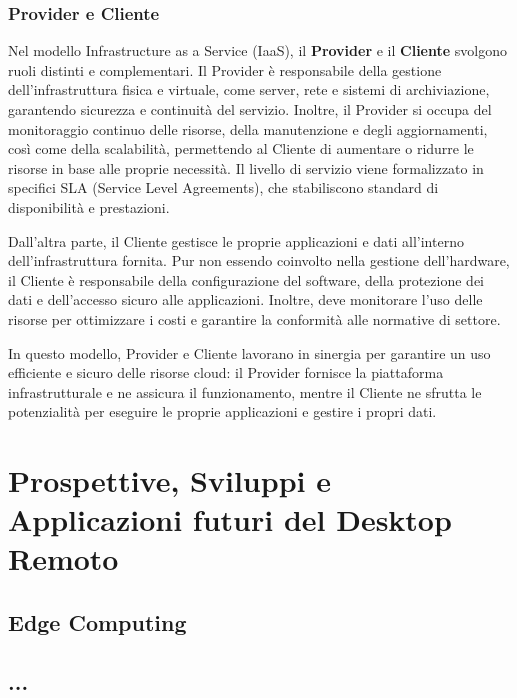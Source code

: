 \documentclass[12pt,a4paper,openright,twoside]{book}
\begin{document}
\subsection{Provider e Cliente}
\label{subsec:provider_cliente}

Nel modello Infrastructure as a Service (IaaS), il \textbf{Provider} e il \textbf{Cliente} svolgono ruoli distinti e complementari. Il Provider è responsabile della gestione dell'infrastruttura fisica e virtuale, come server, rete e sistemi di archiviazione, garantendo sicurezza e continuità del servizio. Inoltre, il Provider si occupa del monitoraggio continuo delle risorse, della manutenzione e degli aggiornamenti, così come della scalabilità, permettendo al Cliente di aumentare o ridurre le risorse in base alle proprie necessità. Il livello di servizio viene formalizzato in specifici SLA (Service Level Agreements), che stabiliscono standard di disponibilità e prestazioni.

Dall'altra parte, il Cliente gestisce le proprie applicazioni e dati all'interno dell'infrastruttura fornita. Pur non essendo coinvolto nella gestione dell'hardware, il Cliente è responsabile della configurazione del software, della protezione dei dati e dell'accesso sicuro alle applicazioni. Inoltre, deve monitorare l'uso delle risorse per ottimizzare i costi e garantire la conformità alle normative di settore.

In questo modello, Provider e Cliente lavorano in sinergia per garantire un uso efficiente e sicuro delle risorse cloud: il Provider fornisce la piattaforma infrastrutturale e ne assicura il funzionamento, mentre il Cliente ne sfrutta le potenzialità per eseguire le proprie applicazioni e gestire i propri dati.



\chapter{Prospettive, Sviluppi e Applicazioni futuri del Desktop Remoto}

\section{Edge Computing}

\section{...}
\end{document}
